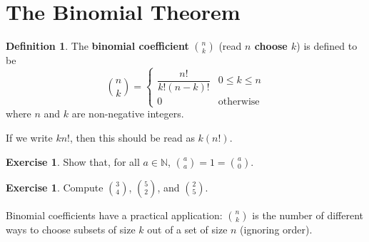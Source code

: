 \documentclass[a4paper]{amsart}
\theoremstyle{definition}
\newtheorem{defn}[thm]{Definition}
\newtheorem{exercise}[thm]{Exercise}
\theoremstyle{remark}
\begin{document}
\section{The Binomial Theorem}
\begin{defn}
  The \textbf{binomial coefficient} $ \binom{n}{k} $ (read \textbf{$ n $ choose $ k $}) is defined to be
  \begin{displaymath}
    \binom{n}{k} = \begin{cases}
                     \dfrac{n!}{k!(n - k)!} & 0 \leq k \leq n\\
                     0 & \text{otherwise}
                   \end{cases}
  \end{displaymath}
  where $ n $ and $ k $ are non-negative integers.
\end{defn}

If we write $ kn! $, then this should be read as $ k(n!) $.

\begin{exercise}
  Show that, for all $ a \in \mathbb{N} $, $ \binom{a}{a} = 1 = \binom{a}{0} $.
\end{exercise}

\begin{exercise}
  Compute $ \binom{3}{4} $, $ \binom{5}{2} $, and $ \binom{2}{5} $.
\end{exercise}

Binomial coefficients have a practical application: $ \binom{n}{k} $ is the number of different ways to choose subsets of size $ k $
out of a set of size $ n $ (ignoring order).
\end{document}
